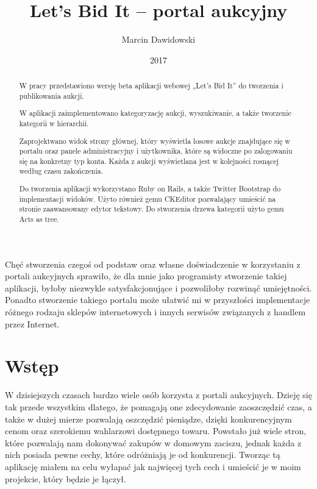 \documentclass[brudnopis]{xmgr}
\author   {Marcin Dawidowski}
\title    {Let’s Bid It – portal aukcyjny}
\date     {2017}
\begin{document}
\begin{abstract}
  W pracy przedstawiono wersję beta aplikacji webowej „Let's Bid It” do tworzenia i publikowania aukcji.
  
  W aplikacji zaimplementowano kategoryzację aukcji, wyszukiwanie, a także tworzenie kategorii w hierarchii.

  Zaprojektwano widok strony głównej, który wyświetla losowe aukcje znajdujące się w portalu oraz panele administracyjny i użytkownika, które są widoczne po zalogowaniu się na konkretny typ konta. Każda z aukcji wyświetlana jest w kolejności rosnącej według czasu zakończenia.

  Do tworzenia aplikacji wykorzystano Ruby on Rails, a także Twitter Bootstrap do implementacji widoków. Użyto również gemu CKEditor pozwalający umieścić na stronie zaawansowany edytor tekstowy. Do stworzenia drzewa kategorii użyto gemu Acts as tree.

\end{abstract}


\maketitle

\introduction

Chęć stworzenia czegoś od podstaw oraz własne doświadczenie w korzystaniu z portali aukcyjnych sprawiło, że dla mnie jako programisty stworzenie takiej aplikacji, byłoby niezwykle satysfakcjonujące i pozwoliłoby rozwinąć umiejętności. Ponadto stworzenie takiego portalu może ułatwić mi w przyszłości implementacje różnego rodzaju sklepów internetowych i innych serwisów związanych z handlem przez Internet.


\chapter{Wstęp}

W dzisiejszych czasach bardzo wiele osób korzysta z portali aukcyjnych. 
Dzieję się tak przede wszystkim dlatego, że pomagają one zdecydowanie
zaoszczędzić czas, a także w dużej mierze pozwalają oszczędzić 
pieniądze, dzięki konkurencyjnym cenom oraz szerokiemu wahlarzowi dostępnego
towaru. Powstało już wiele stron, które pozwalają nam dokonywać zakupów w 
domowym zaciszu, jednak każda z nich posiada pewne cechy, które odróżniają
je od konkurencji. Tworząc tą aplikację miałem na celu wyłapać jak najwięcej 
tych cech i umieścić je w moim projekcie, który będzie je łączył.
\end{document}

